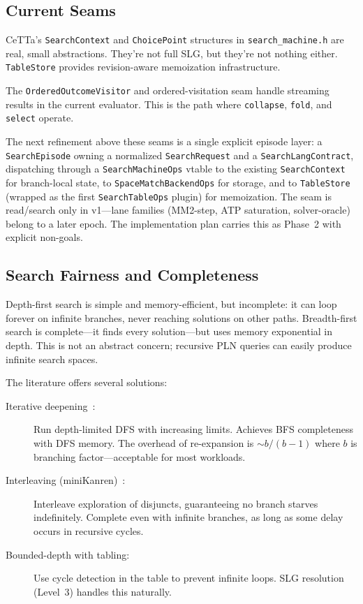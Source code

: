 \documentclass[11pt]{article}
\newcommand{\code}[1]{\texttt{#1}}
\newcommand{\CeTTa}{\textup{CeTTa}}
\begin{document}
\subsection{Current Seams}

\CeTTa{}'s \code{SearchContext} and \code{ChoicePoint} structures in
\code{search\_machine.h} are real, small abstractions.  They're not
full SLG, but they're not nothing either.  \code{TableStore} provides
revision-aware memoization infrastructure.

The \code{OrderedOutcomeVisitor} and ordered-visitation seam handle
streaming results in the current evaluator.  This is the path where
\code{collapse}, \code{fold}, and \code{select} operate.

The next refinement above these seams is a single explicit episode
layer: a \code{SearchEpisode} owning a normalized \code{SearchRequest}
and a \code{SearchLangContract}, dispatching through a
\code{SearchMachineOps} vtable to the existing \code{SearchContext}
for branch-local state, to \code{SpaceMatchBackendOps} for storage,
and to \code{TableStore} (wrapped as the first \code{SearchTableOps}
plugin) for memoization.  The seam is read/search only in v1---lane
families (MM2-step, ATP saturation, solver-oracle) belong to a later
epoch.  The implementation plan carries this as Phase~2 with explicit
non-goals.

\subsection{Search Fairness and Completeness}

Depth-first search is simple and memory-efficient, but incomplete: it can
loop forever on infinite branches, never reaching solutions on other paths.
Breadth-first search is complete---it finds every solution---but uses
memory exponential in depth.  This is not an abstract concern; recursive
PLN queries can easily produce infinite search spaces.

The literature offers several solutions:
\begin{description}
\item[Iterative deepening~\cite{Korf1985}:] Run depth-limited DFS with
  increasing limits.  Achieves BFS completeness with DFS memory.  The
  overhead of re-expansion is $\sim b/(b{-}1)$ where $b$ is branching
  factor---acceptable for most workloads.
\item[Interleaving (miniKanren)~\cite{FriedmanByrd2005}:] Interleave
  exploration of disjuncts, guaranteeing no branch starves indefinitely.
  Complete even with infinite branches, as long as some delay occurs
  in recursive cycles.
\item[Bounded-depth with tabling:] Use cycle detection in the table to
  prevent infinite loops.  SLG resolution (Level~3) handles this naturally.
\end{description}
\end{document}
